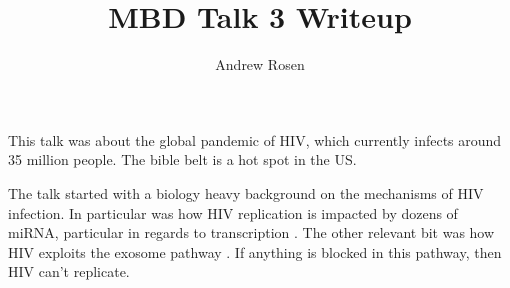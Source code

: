 \documentclass[10pt,letterpaper]{article}
\author{Andrew Rosen}
\title{MBD Talk 3 Writeup}
\begin{document}
	\maketitle
	This talk was about the global pandemic of HIV, which currently infects around 35 million people.
	The bible belt is a hot spot in the US.
	
	
	The talk started with a biology heavy background on the mechanisms of HIV infection.
	In particular was how HIV replication is impacted by dozens of miRNA, particular in regards to transcription \cite{klase2012micrornas}.
	The other relevant bit was how HIV exploits the exosome pathway \cite{nguyen2003evidence}.  
	If anything is blocked in this pathway, then HIV can't replicate.
	 
	
	
	
	
	
\end{document}
